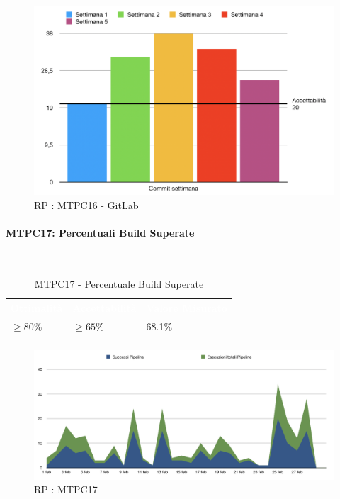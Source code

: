 \begin{figure}[H]
	\begin{center}
		\includegraphics[scale=0.5]{./images/grafici_RP/commitGitlab.png} 
	\end{center}
	\caption{RP : MTPC16 - GitLab}
\end{figure}


\paragraph{MTPC17: Percentuali Build Superate}\-\\

\begin{longtable}{|C{.15\textwidth}|C{.24\textwidth}|C{.24\textwidth}|}
\hline
{}\textbf{\textcolor{white}{Ottimalità}} & \textbf{\textcolor{white}{Accettabilità}} & \textbf{\textcolor{white}{Valore Misurato}} \\
\hline \hline
\endhead
 $\geq 80$\% & $\geq 65$\% & 68.1\% \\
\hline

\caption{MTPC17 - Percentuale Build Superate}
\label{mtpc17}
\end{longtable}
\begin{figure}[H]
	\begin{center}
		\includegraphics[scale=0.5]{./images/grafici_RP/graficoPipeline.png} 
	\end{center}
	\caption{RP : MTPC17}
\end{figure}

